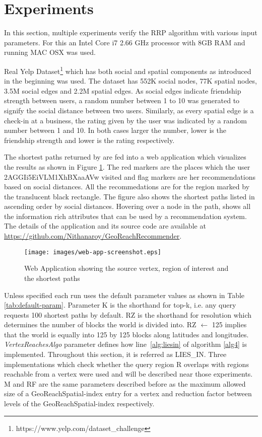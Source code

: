 \section{Experiments} \label{sec:experiment}

In this section, multiple experiments verify the RRP algorithm with various input parameters. For this an Intel Core i7 2.66 GHz processor with 8GB RAM and running MAC OSX was used. 

Real Yelp Dataset\footnote{https://www.yelp.com/dataset\_challenge} which has both social and spatial components as introduced in the beginning was used. The dataset has 552K social nodes, 77K spatial nodes, 3.5M social edges and 2.2M spatial edges. As social edges indicate friendship strength between users, a random number between 1 to 10 was generated to signify the social distance between two users. Similarly, as every spatial edge is a check-in at a business, the rating given by the user was indicated by a random number between 1 and 10. In both cases larger the number, lower is the friendship strength and lower is the rating respectively. 

The shortest paths returned by {\rrp} are fed into a web application which visualizes the results as shown in Figure \ref{fig:web-app}. The red markers are the places which the user 2AGGIi5EiVLM1XhBXaaAVw visited and flag markers are her recommendations based on social distances. All the recommedations are for the region marked by the translucent black rectangle. The figure also shows the shortest paths listed in ascending order by social distances. Hovering over a node in the path, shows all the information rich attributes that can be used by a recommendation system. The details of the application and its source code are available at \url{https://github.com/Nithanaroy/GeoReachRecommender}.

\begin{figure}[t]
	\centering \texttt{[image: images/web-app-screenshot.eps]}
    \caption{Web Application showing the source vertex, region of interest and the shortest paths}
    \label{fig:web-app}
\end{figure}

Unless specified each run uses the default parameter values as shown in Table \ref{tab:default-param}. Parameter K is the shorthand for top-k, i.e. any query requests 100 shortest paths by default. RZ is the shorthand for resolution which determines the number of blocks the world is divided into. RZ $\gets$ 125 implies that the world is equally into 125 by 125 blocks along latitudes and longitudes. \textit{VertexReachesAlgo} parameter defines how line~\ref{alg:liesin} of algorithm \ref{alg4} is implemented. Throughout this section, it is referred as LIES\_IN. Three implementations which check whether the query region R overlaps with regions reachable from a vertex were used and will be described near those experiments. M and RF are the same parameters described before as the maximum allowed size of a GeoReachSpatial-index entry for a vertex and reduction factor between levels of the GeoReachSpatial-index respectively.

